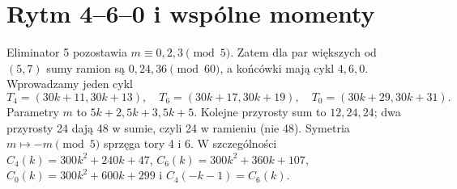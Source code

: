 \documentclass[11pt,a4paper]{article}
\theoremstyle{definition}\newtheorem{defn}[tw]{Definicja}
\theoremstyle{remark}\newtheorem*{uw}{Uwaga}
\begin{document}
\section{Rytm 4--6--0 i wspólne momenty}
Eliminator 5 pozostawia $m\equiv0,2,3\pmod5$. Zatem dla par większych od
$(5,7)$ sumy ramion są $0,24,36\pmod{60}$, a końcówki mają cykl $4,6,0$.
Wprowadzamy jeden cykl
\begin{equation}\label{eq:cycle}
 T_4=(30k+11,30k+13),\quad T_6=(30k+17,30k+19),\quad
 T_0=(30k+29,30k+31).
\end{equation}
Parametry $m$ to $5k+2,5k+3,5k+5$. Kolejne przyrosty sum to $12,24,24$;
dwa przyrosty 24 dają 48 w sumie, czyli 24 w ramieniu (nie 48).
Symetria $m\mapsto-m\pmod5$ sprzęga tory 4 i 6. W szczególności
$C_4(k)=300k^2+240k+47$, $C_6(k)=300k^2+360k+107$,
$C_0(k)=300k^2+600k+299$ i $C_4(-k-1)=C_6(k)$.
\end{document}

